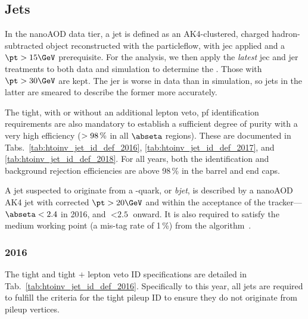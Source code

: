

\subsection{Jets}
\label{subsec:objects_jets}

In the nanoAOD data tier, a \gls{jet} is defined as an AK4-clustered, charged hadron-subtracted object reconstructed with the \gls{particleflow}, with \acrlong{jec} applied and a $\pt > \text{15}\GeV$ prerequisite. For the analysis, we then apply the \emph{latest} \acrshort{jec} and \acrfull{jer} treatments to both data and simulation to determine the \pt. Those with $\pt > \text{30}\GeV$ are kept. The \acrshort{jer} is worse in data than in simulation, so \glspl{jet} in the latter are smeared to describe the former more accurately.


The tight, with or without an additional lepton veto, \acrshort{pf} identification requirements are also mandatory to establish a sufficient degree of purity with a very high efficiency ($> \text{98\,\%}$ in all $\abseta$ regions). These are documented in Tabs.~\ref{tab:htoinv_jet_id_def_2016}, \ref{tab:htoinv_jet_id_def_2017}, and \ref{tab:htoinv_jet_id_def_2018}. For all years, both the identification and background rejection efficiencies are above 98\,\% in the barrel and end caps.

A \gls{jet} suspected to originate from a \Pbottom-quark, or \emph{\gls{bjet}}, is described by a nanoAOD AK4 \gls{jet} with corrected $\pt > \text{20}\GeV$ and within the acceptance of the tracker---$\abseta < \text{2.4}$ in 2016, and $< \text{2.5}$ onward. It is also required to satisfy the medium working point (a mis-tag rate of 1\,\%) from the \deepcsv algorithm~\cite{Sirunyan:2017ezt}.




\subsubsection{2016}
\label{subsubsec:objects_jets_2016}

The tight and tight $+$ lepton veto ID specifications are detailed in Tab.~\ref{tab:htoinv_jet_id_def_2016}. Specifically to this year, all \glspl{jet} are required to fulfill the criteria for the tight pileup ID to ensure they do not originate from pileup vertices.

